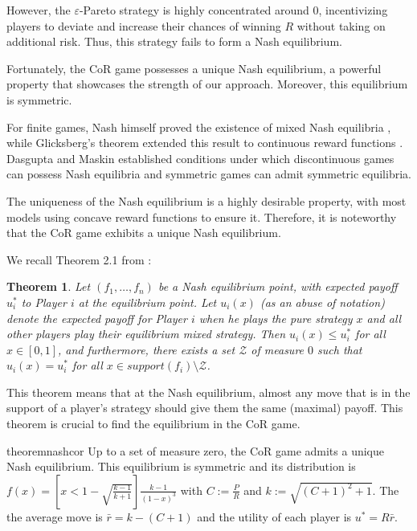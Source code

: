\documentclass[preprint,12pt,authoryear,doubleblind]{elsarticle}
\newtheorem{theorem}{Theorem}[section]
\theoremstyle{definition}
\begin{document}
However, the $\varepsilon$-Pareto strategy is highly concentrated around $0$, incentivizing players to deviate and increase their chances of winning $R$ without taking on additional risk. Thus, this strategy fails to form a Nash equilibrium.

Fortunately, the CoR game possesses a unique Nash equilibrium, a powerful property that showcases the strength of our approach. Moreover, this equilibrium is symmetric.

For finite games, Nash himself proved the existence of mixed Nash equilibria \citep{Nash1950-jp}, while Glicksberg's theorem extended this result to continuous reward functions \citep{Glicksberg1951-wp}. Dasgupta and Maskin \citep{Dasgupta1986-gu} established conditions under which discontinuous games can possess Nash equilibria and symmetric games can admit symmetric equilibria.

The uniqueness of the Nash equilibrium is a highly desirable property, with most models using concave reward functions to ensure it. Therefore, it is noteworthy that the CoR game exhibits a unique Nash equilibrium.

We recall Theorem 2.1 from \citet{Lotker2008-tx}:

\begin{theorem}
\label{thm:jules}
Let $(f_1, \ldots , f_n)$ be a Nash equilibrium point, with expected payoff $u_i^*$ to Player $i$ at the equilibrium point. Let $u_i(x)$ (as an abuse of notation) denote the expected payoff for Player $i$ when he plays the pure strategy $x$ and all other players play their equilibrium mixed strategy. Then $u_i(x) \leq u_i^*$ for all $x \in [0, 1]$, and furthermore, there exists a set $\mathcal{Z}$ of measure $0$ such that $u_i(x) = u_i^*$ for all $x \in support(f_i) \setminus \mathcal{Z}$.
\end{theorem}

This theorem means that at the Nash equilibrium, almost any move that is in the support of a player's strategy should give them the same (maximal) payoff. This theorem is crucial to find the equilibrium in the CoR game.

\begin{restatable}{theorem}{nashcor}
\label{thm:nashcor}
Up to a set of measure zero, the CoR game admits a unique Nash equilibrium. This equilibrium is symmetric and its distribution is $f(x) = \left[x < 1 - \sqrt{\frac{k - 1}{k + 1}}\right] \frac{ k - 1}{(1-x)^3}$ with $C := \frac{P}{R}$ and $k := \sqrt{(C + 1)^2 + 1}$. The the average move is $\bar r = k - (C+1)$ and the utility of each player is $u^* = R \bar r$.
\end{restatable}
\end{document}
